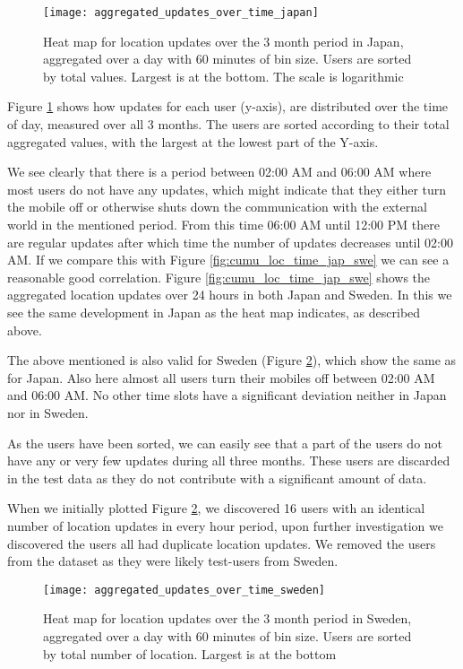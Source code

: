 \begin{figure}[H]
    \hspace*{-0.8cm}
    \centering
    \texttt{[image: aggregated\_updates\_over\_time\_japan]}
    \caption{Heat map for location updates over the 3 month period in Japan, aggregated over a day with 60 minutes of bin size. Users are sorted by total values. Largest is at the bottom. The scale is logarithmic}
    \label{fig:agg_heatmap_jap}
\end{figure}
Figure \ref{fig:agg_heatmap_jap} shows how updates for each user (y-axis), are distributed over the time of day, measured over all 3 months. The users are sorted according to their total aggregated values, with the largest at the lowest part of the Y-axis.  

We see clearly that there is a period between 02:00 AM and 06:00 AM where most users do not have any updates, which might indicate that they either turn the mobile off or otherwise shuts down the communication with the external world in the mentioned period. From this time 06:00 AM until 12:00 PM there are regular updates after which time the number of updates decreases until 02:00 AM. If we compare this with Figure \ref{fig:cumu_loc_time_jap_swe} we can see a reasonable good correlation. Figure \ref{fig:cumu_loc_time_jap_swe} shows the  aggregated location updates over 24 hours in both Japan and Sweden. In this we see the same development in Japan as the heat map indicates, as described above. 

The above mentioned is also valid for Sweden (Figure \ref{fig:agg_heatmap_swe}), which show the same as for Japan. Also here almost all users turn their mobiles off between 02:00 AM and 06:00 AM. 
No other time slots have a significant deviation neither in Japan nor in Sweden.  

As the users have been sorted, we can easily see that a part of the users do not have any or very few updates during all three months. These users are discarded in the test data as they do not contribute with a significant amount of data.  

When we initially plotted Figure \ref{fig:agg_heatmap_swe}, we discovered 16 users with an identical number of location updates in every hour period, upon further investigation we discovered the users all had duplicate location updates. We removed the users from the dataset as they were likely test-users from Sweden.

\begin{figure}[H]
    \hspace*{-0.8cm}
    \centering
    \texttt{[image: aggregated\_updates\_over\_time\_sweden]}
    \caption{Heat map for location updates over the 3 month period in Sweden, aggregated over a day with 60 minutes of bin size. Users are sorted by total number of location. Largest is at the bottom}
    \label{fig:agg_heatmap_swe}
\end{figure}

